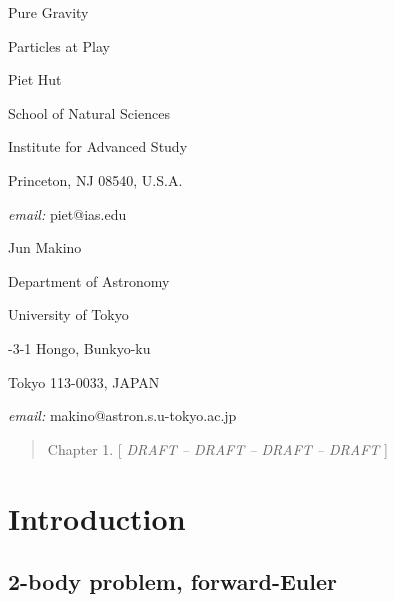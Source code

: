 \begin{center}

{\lgggb Pure Gravity}

\bigskip

{\lggb Particles at Play}

\bigskip

\bigskip

\bigskip

{\slgh Piet Hut}

\bigskip

{\lr School of Natural Sciences}

\medskip

{\lr Institute for Advanced Study}

\medskip

{\lr Princeton, NJ 08540, U.S.A.}

\medskip

{{\it email:} piet@ias.edu}

\bigskip

\bigskip

{\slgh Jun Makino}

\bigskip

{\lr Department of Astronomy}

\medskip

{\lr University of Tokyo}

\medskip

{-3-1 Hongo, Bunkyo-ku}

\medskip

{\lr Tokyo 113-0033, JAPAN}

\medskip

{{\it email:} makino@astron.s.u-tokyo.ac.jp}

\end{center}

\bigskip

\bigskip

\begin{abstract}

Chapter 1. [ {\it DRAFT -- DRAFT -- DRAFT -- DRAFT } ]

\end{abstract}

\newpage
\section{Introduction}

\subsection{2-body problem, forward-Euler}

